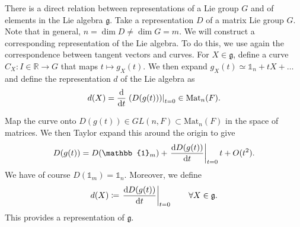 \begin{claim}
  There is a direct relation between representations of a Lie group $G$ and of elements in the Lie algebra $\mathfrak{g}$.
  Take a representation $D$ of a matrix Lie group $G$. Note that in general, $n = \dim D \neq \dim G = m$. We will construct a corresponding representation of the Lie algebra.
  To do this, we use again the correspondence between tangent vectors and curves.
  For $X \in \mathfrak{g}$, define a curve $C_X \colon I \in \mathbb{R} \to G$ that maps $t \mapsto g_X(t)$. We then expand $g_X(t) \simeq \mathbb{1}_n + t X + \dots$ and define the representation $d$ of the Lie algebra as
  \begin{equation}
    d(X) = \dv{}{t} \left. \left( D(g(t)) \right) \right\rvert_{t=0} \in \text{Mat}_n(F).
  \end{equation}

  Map the curve onto $D(g(t)) \in GL(n, F) \subset \text{Mat}_n(F)$ in the space of matrices.
  We then Taylor expand this around the origin to give
  \begin{equation}
    D(g(t)) = D(\mathbb{1}_m) + \left.\dv{D(g(t))}{t}\right\rvert_{t = 0} t + O(t^2).
  \end{equation}
  We have of course $D(\mathbb{1}_m) = \mathbb{1}_n$. Moreover, we define 
  \begin{equation}
    d(X) \coloneqq \left.\dv{D(g(t))}{t}\right\rvert_{t=0} \qquad \forall X \in \mathfrak{g}.
  \end{equation}
  This provides a representation of $\mathfrak{g}$.
\end{claim}


